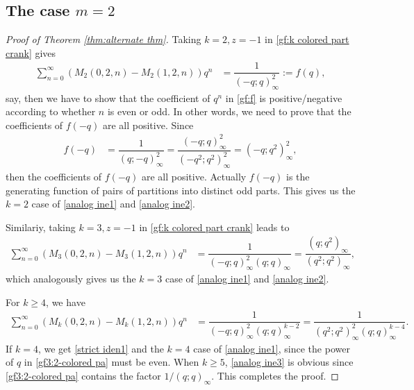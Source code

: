 \documentclass[12pt]{amsart}
\numberwithin{equation}{section}
\theoremstyle{plain}
\theoremstyle{definition}
\begin{document}
\subsection{The case $m=2$}

\begin{proof}[Proof of Theorem \ref{thm:alternate thm}]
Taking $k=2, z=-1$ in \eqref{gf:k colored part crank} gives
\begin{align}
\sum_{n=0}^{\infty}\left(M_{2}(0,2,n)-M_{2}(1,2,n)\right)q^{n} &=\dfrac{1}{(-q;q)_{\infty}^{2}}:=f(q),\label{gf:f}
\end{align}
say, then we have to show that the coefficient of $q^{n}$ in \eqref{gf:f} is positive/negative according to whether $n$ is even or odd. In other words, we need to prove that the coefficients of $f(-q)$ are all positive. Since
\begin{align*}
f(-q) &=\dfrac{1}{(q;-q)_{\infty}^{2}}=\dfrac{(-q;q)_{\infty}^{2}}{(-q^{2};q^{2})_{\infty}^{2}}=(-q;q^{2})_{\infty}^{2},
\end{align*}
then the coefficients of $f(-q)$ are all positive. Actually $f(-q)$ is the generating function of pairs of partitions into distinct odd parts. This gives us the $k=2$ case of \eqref{analog ine1} and \eqref{analog ine2}.

Similariy, taking $k=3, z=-1$ in \eqref{gf:k colored part crank} leads to
\begin{align*}
\sum_{n=0}^{\infty}\left(M_{3}(0,2,n)-M_{3}(1,2,n)\right)q^{n} &=\dfrac{1}{(-q;q)_{\infty}^{2}(q;q)_{\infty}}=\dfrac{(q;q^{2})_{\infty}}{(q^{2};q^{2})_{\infty}},
\end{align*}
which analogously gives us the $k=3$ case of \eqref{analog ine1} and \eqref{analog ine2}.

For $k\geq4$, we have
\begin{align}\label{gf3:2-colored pa}
\sum_{n=0}^{\infty}\left(M_{k}(0,2,n)-M_{k}(1,2,n)\right)q^{n} &=\dfrac{1}{(-q;q)_{\infty}^{2}(q;q)_{\infty}^{k-2}}=\dfrac{1}{(q^{2};q^{2})_{\infty}^{2}(q;q)_{\infty}^{k-4}}.
\end{align}
If $k=4$, we get \eqref{strict iden1} and the $k=4$ case of \eqref{analog ine1}, since the power of $q$ in \eqref{gf3:2-colored pa} must be even. When $k\geq5$, \eqref{analog ine3} is obvious since \eqref{gf3:2-colored pa} contains the factor $1/(q;q)_{\infty}$. This completes the proof.
\end{proof}
\end{document}
